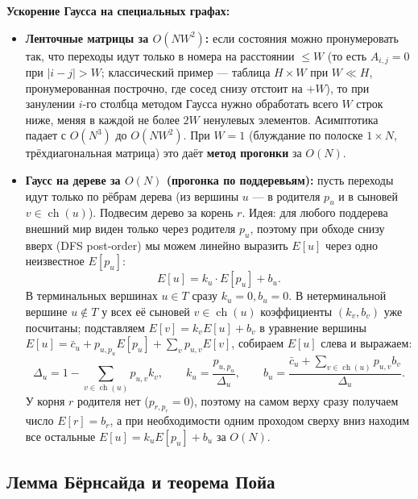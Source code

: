 \documentclass[10pt,a4paper]{article}
\renewcommand{\le}{\leqslant}
\begin{document}
\textbf{Ускорение Гаусса на специальных графах:}
\begin{itemize}
  \item \textbf{Ленточные матрицы за $O(N W^2)$:} если состояния можно пронумеровать так, что переходы идут только в номера на расстоянии $\le W$ (то есть $A_{i,j} = 0$ при $|i - j| > W$; классический пример — таблица $H \times W$ при $W \ll H$, пронумерованная построчно, где сосед снизу отстоит на $+W$), то при занулении $i$-го столбца методом Гаусса нужно обработать всего $W$ строк ниже, меняя в каждой не более $2W$ ненулевых элементов. Асимптотика падает с $O(N^3)$ до $O(N W^2)$. При $W = 1$ (блуждание по полоске $1 \times N$, трёхдиагональная матрица) это даёт \textbf{метод прогонки} за $O(N)$.
  \item \textbf{Гаусс на дереве за $O(N)$ (прогонка по поддеревьям):} пусть переходы идут только по рёбрам дерева (из вершины $u$ — в родителя $p_u$ и в сыновей $v \in \operatorname{ch}(u)$). Подвесим дерево за корень $r$. Идея: для любого поддерева внешний мир виден только через родителя $p_u$, поэтому при обходе снизу вверх (DFS post-order) мы можем линейно выразить $E[u]$ через одно неизвестное $E[p_u]$:
  \[
    E[u] = k_u \cdot E[p_u] + b_u.
  \]
  В терминальных вершинах $u \in T$ сразу $k_u = 0, b_u = 0$. В нетерминальной вершине $u \notin T$ у всех её сыновей $v \in \operatorname{ch}(u)$ коэффициенты $(k_v, b_v)$ уже посчитаны; подставляем $E[v] = k_v E[u] + b_v$ в уравнение вершины $E[u] = \bar{c}_u + p_{u, p_u} E[p_u] + \sum_v p_{u,v} E[v]$, собираем $E[u]$ слева и выражаем:
  \[
    \Delta_u = 1 - \sum_{v \in \operatorname{ch}(u)} p_{u,v} k_v, \qquad
    k_u = \frac{p_{u, p_u}}{\Delta_u}, \qquad
    b_u = \frac{\bar{c}_u + \sum_{v \in \operatorname{ch}(u)} p_{u,v} b_v}{\Delta_u}.
  \]
  У корня $r$ родителя нет ($p_{r, p_r} = 0$), поэтому на самом верху сразу получаем число $E[r] = b_r$, а при необходимости одним проходом сверху вниз находим все остальные $E[u] = k_u E[p_u] + b_u$ за $O(N)$.
\end{itemize}

\subsection{Лемма Бёрнсайда и теорема Пойа}
\end{document}
